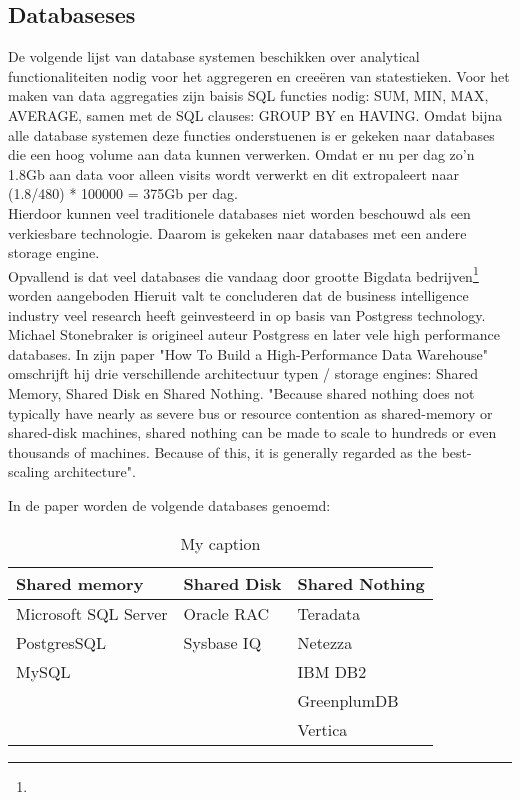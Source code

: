 \subsection{Databaseses}

De volgende lijst van database systemen beschikken over analytical functionaliteiten nodig voor het aggregeren en creeëren van statestieken. Voor het maken van data aggregaties zijn baisis SQL functies nodig: SUM, MIN, MAX, AVERAGE, samen met de SQL clauses: GROUP BY en HAVING. Omdat bijna alle database systemen deze functies onderstuenen is er gekeken naar databases die een hoog volume aan data kunnen verwerken. 
Omdat er nu per dag zo'n 1.8Gb aan data voor alleen visits wordt verwerkt en dit extropaleert naar (1.8/480) * 100000 = 375Gb per dag. \\

Hierdoor kunnen veel traditionele databases niet worden beschouwd als een verkiesbare technologie. Daarom is gekeken naar databases met een andere storage engine. \\

Opvallend is dat veel databases die vandaag door grootte Bigdata bedrijven\footnote{} worden aangeboden 
Hieruit valt te concluderen dat de business intelligence industry veel research heeft geinvesteerd in op basis van Postgress technology. \\

Michael Stonebraker is origineel auteur Postgress en later vele high performance databases. In zijn paper "How To Build a High-Performance Data Warehouse" omschrijft hij drie verschillende architectuur typen / storage engines: Shared Memory, Shared Disk en Shared Nothing.
"Because shared nothing does not typically have nearly as severe bus or resource contention as shared-memory or shared-disk machines, shared nothing can be made to scale to hundreds or even thousands
of machines. Because of this, it is generally regarded as the best-scaling architecture". \parencite{dewitt2006build}



In de paper worden de volgende databases genoemd:
\begin{table}[bh]
\centering
\caption{My caption}
\label{my-label}
\begin{tabular}{|l|l|l|}
\hline
\textbf{Shared memory} & \textbf{Shared Disk} & \textbf{Shared Nothing} \\ \hline
Microsoft SQL Server   & Oracle RAC           & Teradata \\
\hline
PostgresSQL            & Sysbase IQ           & Netezza \\
\hline
MySQL                  &                      & IBM DB2 \\
\hline
                       &                      & GreenplumDB \\
\hline
                       &                      & Vertica \\
\hline
\end{tabular}
\end{table}

